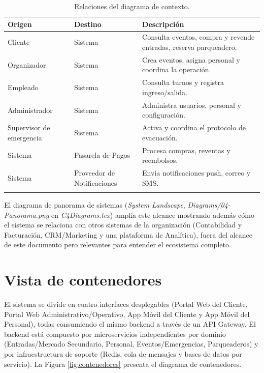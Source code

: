 \documentclass[11pt,a4paper]{article}
\begin{document}
\begin{center}
\begin{longtable}{p{3cm}p{3cm}p{6.5cm}}
\toprule
\textbf{Origen} & \textbf{Destino} & \textbf{Descripción}\\
\midrule
Cliente & Sistema & Consulta eventos, compra y revende entradas, reserva parqueadero.\\
Organizador & Sistema & Crea eventos, asigna personal y coordina la operación.\\
Empleado & Sistema & Consulta turnos y registra ingreso/salida.\\
Administrador & Sistema & Administra usuarios, personal y configuración.\\
Supervisor de emergencia & Sistema & Activa y coordina el protocolo de evacuación.\\
Sistema & Pasarela de Pagos & Procesa compras, reventas y reembolsos.\\
Sistema & Proveedor de Notificaciones & Envía notificaciones push, correo y SMS.\\
\bottomrule
\caption{Relaciones del diagrama de contexto.}
\end{longtable}
\end{center}

El diagrama de panorama de sistemas (\textit{System Landscape}, \textit{Diagrams/04-Panorama.png}
en \textit{C4Diagrams.tex}) amplía este alcance mostrando además cómo el sistema se relaciona con
otros sistemas de la organización (Contabilidad y Facturación, CRM/Marketing y una plataforma de
Analítica), fuera del alcance de este documento pero relevantes para entender el ecosistema
completo.

\section{Vista de contenedores}
\label{sec:contenedores}

El sistema se divide en cuatro interfaces desplegables (Portal Web del Cliente, Portal Web
Administrativo/Operativo, App Móvil del Cliente y App Móvil del Personal), todas consumiendo el
mismo backend a través de un API Gateway. El backend está compuesto por microservicios
independientes por dominio (Entradas/Mercado Secundario, Personal, Eventos/Emergencias,
Parqueaderos) y por infraestructura de soporte (Redis, cola de mensajes y bases de datos por
servicio). La Figura \ref{fig:contenedores} presenta el diagrama de contenedores.
\end{document}
